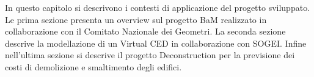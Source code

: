 In questo capitolo si descrivono i contesti di applicazione del progetto sviluppato.
Le prima sezione presenta un overview sul progetto BaM realizzato
in collaborazione con il Comitato Nazionale dei Geometri.
La seconda sezione descrive la modellazione di un Virtual CED in collaborazione con SOGEI.
Infine nell'ultima sezione si descrive il progetto Deconstruction per la previsione dei costi di demolizione
e smaltimento degli edifici.
